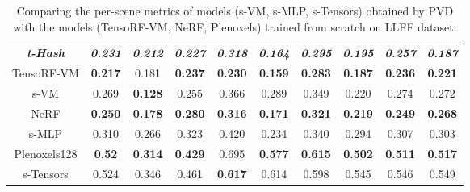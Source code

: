 \documentclass[letterpaper]{article} \usepackage{aaai23}  \usepackage{times}  \usepackage{helvet}  \usepackage{courier}  \usepackage[hyphens]{url}  \usepackage{graphicx} \urlstyle{rm} \def\UrlFont{\rm}  \usepackage{natbib}  \usepackage{caption} \frenchspacing  \setlength{\pdfpagewidth}{8.5in}  \setlength{\pdfpageheight}{11in}  \usepackage{multirow}
\begin{document}
\begin{table*}[t]
{\begin{tabular}{c|ccccccccc}
\textit{\textbf{t-Hash}} & \textit{\textbf{0.231}} & \textit{\textbf{0.212}} & \textit{\textbf{0.227}} & \textit{\textbf{0.318}} & \textit{\textbf{0.164}} & \textit{\textbf{0.295}} & \textit{\textbf{0.195}} & \textit{\textbf{0.257}} & \textit{\textbf{0.187}} \\
TensoRF-VM               & \textbf{0.217}          & 0.181                   & \textbf{0.237}          & \textbf{0.230}          & \textbf{0.159}          & \textbf{0.283}          & \textbf{0.187}          & \textbf{0.236}          & \textbf{0.221}          \\
s-VM                     & 0.269                   & \textbf{0.128}          & 0.255                   & 0.366                   & 0.289                   & 0.349                   & 0.220                   & 0.274                   & 0.272                   \\
NeRF                     & \textbf{0.250}          & \textbf{0.178}          & \textbf{0.280}          & \textbf{0.316}          & \textbf{0.171}          & \textbf{0.321}          & \textbf{0.219}          & \textbf{0.249}          & \textbf{0.268}          \\
s-MLP                    & 0.310                   & 0.266                   & 0.323                   & 0.420                   & 0.234                   & 0.340                   & 0.294                   & 0.307                   & 0.303                   \\
Plenoxels128             & \textbf{0.52}           & \textbf{0.314}          & \textbf{0.429}          & 0.695                   & \textbf{0.577}          & \textbf{0.615}          & \textbf{0.502}          & \textbf{0.511}          & \textbf{0.517}          \\
s-Tensors                & 0.524                   & 0.346                   & 0.461                   & \textbf{0.617}          & 0.614                   & 0.598                   & 0.545                   & 0.546                   & 0.549                   \\ \hline
\end{tabular}
}
\caption{Comparing the per-scene metrics of models (s-VM, s-MLP, s-Tensors) obtained by PVD with the models (TensoRF-VM, NeRF, Plenoxels) trained from scratch on LLFF dataset.}
\label{tab-gp2others-llff}
\end{table*}
\end{document}
